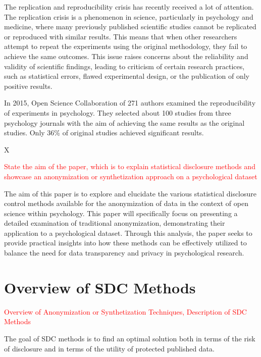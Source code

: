 \documentclass{article}
\begin{document}
The replication and reproducibility crisis has recently received a lot of attention. 
The replication crisis is a phenomenon in science, particularly in psychology and medicine, where many previously published scientific studies cannot be replicated or reproduced with similar results. This means that when other researchers attempt to repeat the experiments using the original methodology, they fail to achieve the same outcomes. This issue raises concerns about the reliability and validity of scientific findings, leading to criticism of certain research practices, such as statistical errors, flawed experimental design, or the publication of only positive results.

In 2015, Open Science Collaboration \cite{2015_OSC} of 271 authors examined the reproducibility of experiments in psychology. They selected about 100 studies from three psychology journals with the aim of achieving the same results as the original studies.  Only 36\% of original studies achieved significant results.


X
\newline

\textcolor{red}{State the aim of the paper, which is to explain statistical disclosure methods and showcase an anonymization or synthetization approach on a psychological dataset}

The aim of this paper is to explore and elucidate the various statistical disclosure control methods available for the anonymization of data in the context of open science within psychology. 
This paper will specifically focus on presenting a detailed examination of traditional anonymization, demonstrating their application to a psychological dataset. Through this analysis, the paper seeks to provide practical insights into how these methods can be effectively utilized to balance the need for data transparency and privacy in psychological research.

\section{Overview of SDC Methods}

\textcolor{red}{Overview of Anonymization or Synthetization Techniques, Description of SDC Methods}

The goal of SDC methods is to find an optimal solution both in terms of the risk of disclosure and in terms of the utility of protected published data.
\end{document}
